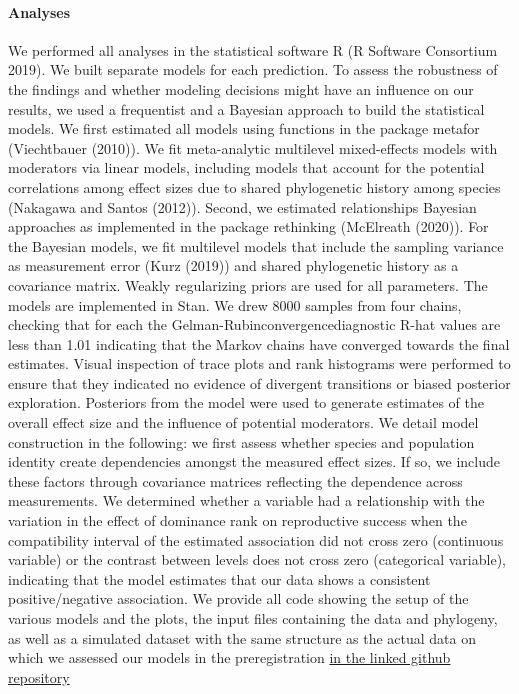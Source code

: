 \documentclass[
]{article}
\begin{document}
\hypertarget{analyses}{%
\paragraph{\texorpdfstring{\textbf{Analyses}}{Analyses}}\label{analyses}}

We performed all analyses in the statistical software R (R Software
Consortium 2019). We built separate models for each prediction. To
assess the robustness of the findings and whether modeling decisions
might have an influence on our results, we used a frequentist and a
Bayesian approach to build the statistical models. We first estimated
all models using functions in the package metafor (Viechtbauer (2010)).
We fit meta-analytic multilevel mixed-effects models with moderators via
linear models, including models that account for the potential
correlations among effect sizes due to shared phylogenetic history among
species (Nakagawa and Santos (2012)). Second, we estimated relationships
Bayesian approaches as implemented in the package rethinking (McElreath
(2020)). For the Bayesian models, we fit multilevel models that include
the sampling variance as measurement error (Kurz (2019)) and shared
phylogenetic history as a covariance matrix. Weakly regularizing priors
are used for all parameters. The models are implemented in Stan. We drew
8000 samples from four chains, checking that for each the
Gelman-Rubinconvergencediagnostic R-hat values are less than 1.01
indicating that the Markov chains have converged towards the final
estimates. Visual inspection of trace plots and rank histograms were
performed to ensure that they indicated no evidence of divergent
transitions or biased posterior exploration. Posteriors from the model
were used to generate estimates of the overall effect size and the
influence of potential moderators. We detail model construction in the
following: we first assess whether species and population identity
create dependencies amongst the measured effect sizes. If so, we include
these factors through covariance matrices reflecting the dependence
across measurements. We determined whether a variable had a relationship
with the variation in the effect of dominance rank on reproductive
success when the compatibility interval of the estimated association did
not cross zero (continuous variable) or the contrast between levels does
not cross zero (categorical variable), indicating that the model
estimates that our data shows a consistent positive/negative
association. We provide all code showing the setup of the various models
and the plots, the input files containing the data and phylogeny, as
well as a simulated dataset with the same structure as the actual data
on which we assessed our models in the preregistration
\href{https://github.com/dieterlukas/FemaleDominanceReproduction_MetaAnalysis}{in
the linked github repository}
\end{document}
